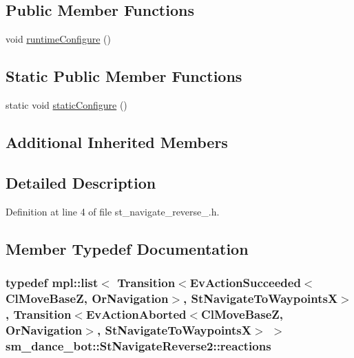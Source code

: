 \subsection*{Public Member Functions}
\begin{DoxyCompactItemize}
\item 
void \hyperlink{structsm__dance__bot_1_1StNavigateReverse2_ab3647aed4704121ce2edd91441a1c716}{runtime\+Configure} ()
\end{DoxyCompactItemize}
\subsection*{Static Public Member Functions}
\begin{DoxyCompactItemize}
\item 
static void \hyperlink{structsm__dance__bot_1_1StNavigateReverse2_ae4809f28ccc5378f7a8f3c829d29d925}{static\+Configure} ()
\end{DoxyCompactItemize}
\subsection*{Additional Inherited Members}


\subsection{Detailed Description}


Definition at line 4 of file st\+\_\+navigate\+\_\+reverse\+\_.\+h.



\subsection{Member Typedef Documentation}
\subsubsection[{\texorpdfstring{reactions}{reactions}}]{\setlength{\rightskip}{0pt plus 5cm}typedef mpl\+::list$<$ Transition$<$Ev\+Action\+Succeeded$<${\bf Cl\+Move\+BaseZ}, {\bf Or\+Navigation}$>$, {\bf St\+Navigate\+To\+WaypointsX}$>$, Transition$<$Ev\+Action\+Aborted$<${\bf Cl\+Move\+BaseZ}, {\bf Or\+Navigation}$>$, {\bf St\+Navigate\+To\+WaypointsX}$>$ $>$ {\bf sm\+\_\+dance\+\_\+bot\+::\+St\+Navigate\+Reverse2\+::reactions}}\hypertarget{structsm__dance__bot_1_1StNavigateReverse2_a629dbeb24a7b120d7dfebeb4b9630d64}{}\label{structsm__dance__bot_1_1StNavigateReverse2_a629dbeb24a7b120d7dfebeb4b9630d64}


